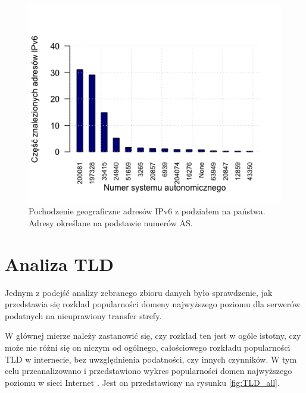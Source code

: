 \begin{figure}[h]
	\centering
	\includegraphics[width=1.0\textwidth]{image/Ipv6_as_count_no_title}
	\caption{Pochodzenie geograficzne adresów IPv6 z podziałem na państwa. Adresy określane na podstawie numerów AS.}
	\label{fig:ipv6_co}
\end{figure}

\section{Analiza TLD}
\noindent Jednym z podejść analizy zebranego zbioru danych było sprawdzenie, jak przedstawia się rozkład popularności domeny najwyższego poziomu
dla serwerów podatnych na nieuprawiony transfer strefy.

W głównej mierze należy zastanowić się, czy rozkład ten jest w ogóle istotny, czy może nie różni się on niczym od ogólnego,
całościowego rozkładu popularności TLD w internecie, bez uwzględnienia podatności, czy innych czynników. W tym celu przeanalizowano
i przedstawiono wykres popularności domen najwyższego poziomu w sieci Internet \cite{TLD_popularity}. Jest on przedstawiony na
rysunku \ref{fig:TLD_all}.

